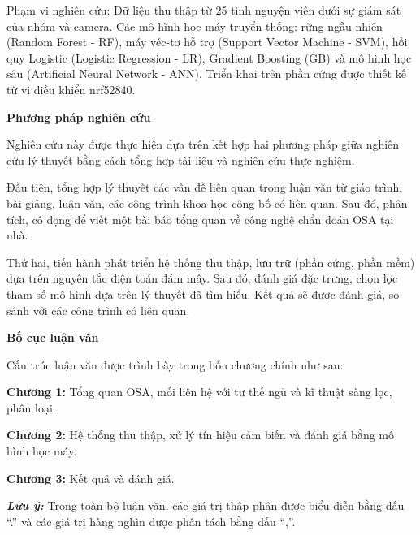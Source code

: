 Phạm vi nghiên cứu: Dữ liệu thu thập từ 25 tình nguyện viên dưới sự giám sát
của nhóm và camera. Các mô hình học máy truyển thống: rừng ngẫu nhiên (Random
Forest - RF), máy véc-tơ hỗ trợ (Support Vector Machine - SVM), hồi quy
Logistic (Logistic Regression - LR), Gradient Boosting (GB) và mô hình học sâu
(Artificial Neural Network - ANN). Triển khai trên phần cứng được thiết kế từ
vi điều khiển nrf52840.

\noindent\textbf{Phương pháp nghiên cứu}

Nghiên cứu này được thực hiện dựa trên kết hợp hai phương pháp giữa nghiên cứu
lý thuyết bằng cách tổng hợp tài liệu và nghiên cứu thực nghiệm.

Đầu tiên, tổng
hợp lý thuyết các vấn đề liên quan trong luận văn từ giáo trình, bài giảng,
luận văn, các công trình khoa học công bố có liên quan. Sau đó, phân tích, cô
đọng để viết một bài báo tổng quan về công nghệ chẩn đoán OSA tại nhà.

Thứ hai, tiến hành phát triển hệ thống thu thập, lưu trữ (phần cứng, phần mềm)
dựa trên nguyên tắc điện toán đám mây. Sau đó, đánh giá đặc trưng, chọn lọc
tham số mô hình dựa trên lý thuyết đã tìm hiểu. Kết quả sẽ được đánh giá, so
sánh với các công trình có liên quan.

\noindent\textbf{Bố cục luận văn}

Cấu trúc luận văn được trình bày trong bốn chương chính như sau:

\noindent\textbf{Chương 1:} Tổng quan OSA, mối liên hệ với tư thế ngủ và kĩ thuật sàng
lọc, phân loại.

\noindent\textbf{Chương 2:} Hệ thống thu thập, xử lý tín hiệu cảm biến và đánh giá bằng
mô hình học máy.

\noindent\textbf{Chương 3:} Kết quả và đánh giá.


\vspace{0.2cm}
\noindent\textbf{\textit{Lưu ý:}} Trong toàn bộ luận văn, các giá trị thập phân được biểu diễn bằng dấu “.” và các giá trị hàng nghìn được phân tách bằng dấu “,”.
